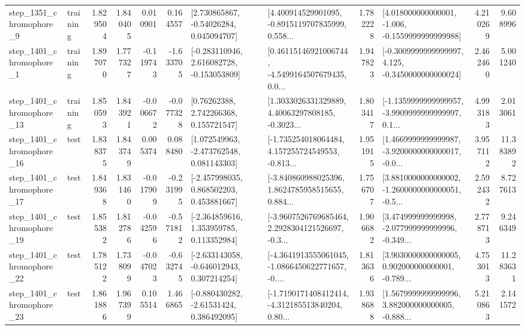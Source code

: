 \begin{tabular}{llrrrrllrlrr}
  step\_1351\_chromophore\_9 &  training &      1.829504 &    1.840405 &      0.010901 &  0.164557 &     [2.730865867, -0.54026284, 0.045094707] &  [4.400914529901095, -0.8915119707835999, 0.558... &       1.782228 &   [4.018000000000001, -1.006, -0.1559999999999988] &            4.210269 &          9.608996 \\
  step\_1401\_chromophore\_1 &  training &      1.897070 &    1.777327 &     -0.119743 & -1.633705 &   [-0.283110946, 2.616082728, -0.153053809] &  [0.46115146921006744, -4.5499164507679435, 0.0... &       1.947823 &  [-0.3009999999999997, 4.125, -0.3450000000000024] &            2.462460 &          5.001240 \\
 step\_1401\_chromophore\_13 &  training &      1.850593 &    1.843921 &     -0.006672 & -0.077328 &      [0.76262388, 2.742266368, 0.155721547] &  [1.3033026331329889, 4.40063297808185, -0.3023... &       1.803417 &  [-1.1359999999999957, -3.9909999999999997, 0.1... &            4.993183 &          2.013061 \\
 step\_1401\_chromophore\_16 &      test &      1.838375 &    1.843749 &      0.005374 &  0.088480 &    [1.072549963, -2.473762548, 0.081143303] &  [-1.735254018064484, 4.157255724549553, -0.813... &       1.951915 &  [1.4669999999999987, -3.9200000000000017, -0.0... &            3.957112 &         11.383892 \\
 step\_1401\_chromophore\_17 &      test &      1.849368 &    1.831460 &     -0.017909 & -0.231995 &    [-2.457998035, 0.868502203, 0.453881667] &  [-3.840860988025396, 1.8624785958515655, 0.884... &       1.756707 &  [3.8810000000000002, -1.2600000000000051, -0.5... &            2.592432 &          8.727613 \\
 step\_1401\_chromophore\_19 &      test &      1.855382 &    1.812786 &     -0.042596 & -0.571812 &    [-2.364859616, 1.353959785, 0.113352984] &  [-3.9607526769685464, 2.2928304121526697, -0.3... &       1.906682 &  [3.474999999999998, -2.077999999999996, -0.349... &            2.778713 &          9.246349 \\
 step\_1401\_chromophore\_22 &      test &      1.785122 &    1.738099 &     -0.047023 & -0.632745 &   [-2.633143058, -0.646012943, 0.307214254] &  [-4.3641913555061045, -1.0866450622771657, -0.... &       1.813636 &  [3.9030000000000005, 0.902000000000001, -0.789... &            4.753013 &         11.283631 \\
 step\_1401\_chromophore\_23 &      test &      1.861886 &    1.967399 &      0.105514 &  1.466865 &    [-0.880430282, -2.61531424, 0.386492095] &  [-1.7190171408412414, -4.312185513840204, 0.80... &       1.938688 &  [1.5679999999999996, 3.882000000000005, -0.888... &            5.210863 &          2.141572 \\

\end{tabular}
